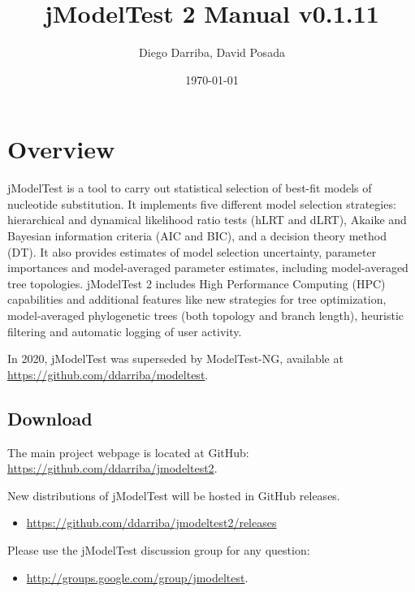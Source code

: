 \documentclass[10pt,twoside,a4paper]{article}
\begin{document}
\providecommand{\versionnumber}{0.1.11}
\title{jModelTest 2 Manual v\versionnumber}
\author{Diego Darriba, David Posada}
\date{\today}
\maketitle

\setcounter{tocdepth}{2}
\tableofcontents

\clearpage

\section{Overview}

jModelTest is a tool to carry out statistical selection of best-fit models of nucleotide substitution. It implements five different model selection strategies: hierarchical and dynamical likelihood ratio tests (hLRT and dLRT), Akaike and Bayesian information criteria (AIC and BIC), and a decision theory method (DT). It also provides estimates of model selection uncertainty, parameter importances and model-averaged parameter estimates, including model-averaged tree topologies. jModelTest 2 includes High Performance Computing (HPC) capabilities and additional features like new strategies for tree optimization, model-averaged phylogenetic trees (both topology and branch length), heuristic filtering and automatic logging of user activity.

In 2020, jModelTest was superseded by ModelTest-NG, available at \url{https://github.com/ddarriba/modeltest}.

\subsection{Download}

The main project webpage is located at GitHub: \url{https://github.com/ddarriba/jmodeltest2}.

New distributions of jModelTest will be hosted in GitHub releases.
\begin{itemize}
  \item \url{https://github.com/ddarriba/jmodeltest2/releases}
\end{itemize}

Please use the jModelTest discussion group for any question: 
\begin{itemize}
  \item \url{http://groups.google.com/group/jmodeltest}.
\end{itemize}
\end{document}
